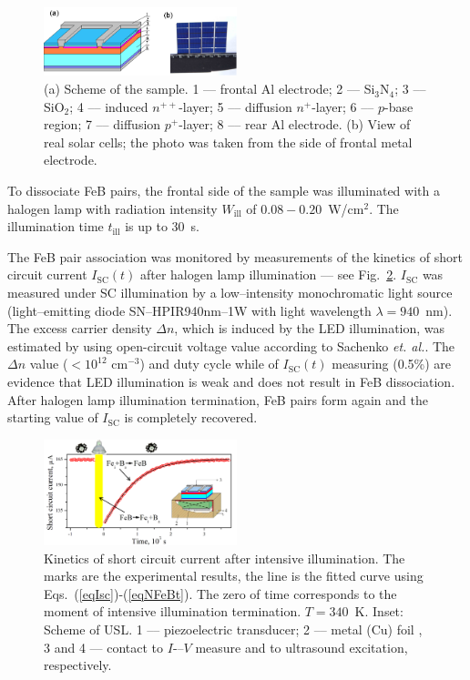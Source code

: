 \documentclass[%
 aip,jap,
 amsmath,amssymb,
 reprint,%
]{revtex4-1}
\begin{document}
\begin{figure}
\includegraphics[width=0.5\textwidth]{Fig1}%
\caption{\label{Fig:sample}
(a) Scheme of the sample.
1 –-- frontal Al electrode;
2 –-- Si$_3$N$_4$;
3 –-- SiO$_2$;
4 –-- induced $n^{++}$-layer;
5 –-- diffusion $n^+$-layer;
6 –-- $p$-base region;
7 –-- diffusion $p^+$-layer;
8 –-- rear Al electrode.
(b) View of real solar cells;
the photo was taken from the side of frontal metal electrode.
}
\end{figure}

To dissociate FeB pairs, the frontal side of the sample was illuminated with a halogen lamp with radiation intensity $W_\mathrm{ill}$ of $0.08-0.20$~W/cm$^2$.
The illumination time $t_\mathrm{ill}$ is up to 30~s.

The FeB pair association was monitored by measurements of the kinetics of
short circuit current $I_\mathrm{SC}(t)$ after halogen lamp illumination –-- see Fig.~\ref{Fig:Method}.
$I_\mathrm{SC}$ was measured under SC illumination by a low--intensity monochromatic light source (light--emitting diode SN--HPIR940nm--1W with light wavelength $\lambda=940$~nm).
The excess carrier density $\Delta n$, which is induced by the LED illumination,
was estimated by using open-circuit voltage value according to Sachenko \emph{et. al.}\cite{JAPSach}.
The $\Delta n$ value ($<10^{12}$ cm$^{-3}$) and duty cycle while of $I_\mathrm{SC}(t)$ measuring (0.5\%)
are evidence that LED illumination is weak and does not result in FeB dissociation.
After halogen lamp illumination termination,
FeB pairs form again and the starting value of $I_\mathrm{SC}$ is completely recovered.

\begin{figure}
\includegraphics[width=0.5\textwidth]{Fig2}%
\caption{\label{Fig:Method}
Kinetics of short circuit current after intensive illumination.
The marks are the experimental results,
the line is the fitted curve using Eqs.~(\ref{eqIsc})-(\ref{eqNFeBt}).
The zero of time corresponds to the moment of intensive illumination termination.
$T=340$~K.
Inset: Scheme of USL.
1 –-- piezoelectric transducer;
2 –-- metal (Cu) foil ,
3 and 4 --- contact to $I$-–$V$ measure and to ultrasound excitation, respectively.
}
\end{figure}
\end{document}
